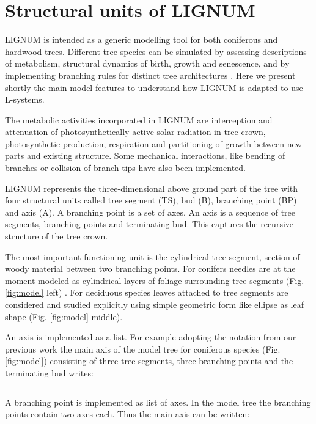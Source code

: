 \section{Structural units of LIGNUM}
LIGNUM is intended as a generic modelling tool for both coniferous and
hardwood trees.  Different tree  species can be simulated by assessing
descriptions of  metabolism, structural dynamics of  birth, growth and
senescence,  and by  implementing  branching rules  for distinct  tree
architectures  \citep{perttunen:96,  perttunen:01}.   Here we  present
shortly the main model features to understand how LIGNUM is adapted to
use L-systems.

The metabolic  activities incorporated in LIGNUM  are interception and
attenuation  of  photosynthetically  active  solar radiation  in  tree
crown,  photosynthetic  production,  respiration and  partitioning  of
growth  between  new parts  and  existing  structure. Some  mechanical
interactions,  like bending of  branches or  collision of  branch tips
have also been implemented.

LIGNUM represents the three-dimensional  above ground part of the tree
with  four  structural  units  called  tree  segment  (TS),  bud  (B),
branching point  (BP) and  axis (A).   A branching point  is a  set of
axes. An  axis is  a sequence of  tree segments, branching  points and
terminating bud.   This captures the  recursive structure of  the tree
crown.

The most  important functioning unit is the  cylindrical tree segment,
section of woody material  between two branching points.  For conifers
needles are  at the  moment modeled as  cylindrical layers  of foliage
surrounding  tree   segments  (Fig.   \ref{fig:model}   left)  .   For
deciduous species leaves attached  to tree segments are considered and
studied explicitly  using simple geometric  form like ellipse  as leaf
shape (Fig. \ref{fig:model} middle).

An axis  is implemented as a  list. For example  adopting the notation
from our previous work \citep{perttunen:96} the main axis of the model
tree for coniferous species (Fig. \ref{fig:model}) consisting of three
tree segments, three branching points and the terminating bud writes:

\begin{equation}
[TS_0,BP_1,TS_2,BP_3,TS_4,BP_5,B_6]
\end{equation}

A branching  point is implemented as  list of axes. In  the model tree
the branching points contain two axes  each. Thus the main axis can be
written:

